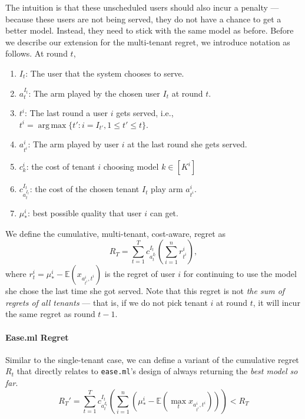 \documentclass[letterpaper]{vldb}
\newcommand{\eml}{\texttt{ease.ml}\xspace}
\DeclareMathOperator*{\argmax}{arg\,max}
\begin{document}
The intuition is that these unscheduled users should
also incur a penalty --- because these users are not being served,
they do not have a chance to
get a better model. Instead, they need to stick
with the same model as before. 
Before we describe our extension for the
multi-tenant regret, we introduce notation
as follows. At round $t$,
\begin{enumerate}[noitemsep,topsep=0pt,parsep=0pt,partopsep=0pt]
\item $I_t$: The user that the system chooses to
serve.
\item $a_{t}^{I_t}$: The arm played by the chosen user $I_t$ at round $t$.
\item $t^i$: The last round a user $i$ gets served, i.e., $t^i = \argmax\{t': i=I_{t'}, 1\le t'\le t\}$.
\item $a_{t^i}^i$: The arm played by user $i$ at the last round she gets served.
\item $c^i_k$: the cost of tenant $i$ choosing model $k\in [K^i]$
\item $c^{I_t}_{a_{t}^{I_t}}$: the cost of the chosen
tenant $I_t$ play arm $a_{t^i}^i$.
\item $\mu_*^i$: best possible quality that 
user $i$ can get.
\end{enumerate}

We define the cumulative,
multi-tenant, cost-aware, regret as
\[
R_T = \sum_{t=1}^T c^{I_t}_{a_{t}^{I_t}} \left (\sum_{i=1}^n r^i_{t^i} \right),
\]
where $r^i_t = \mu_*^i - \mathbb{E}(x_{a_{t^i}^i, t^i})$
is the regret of user $i$ for continuing to
use the model she chose the last time she
got served. 
Note that this regret is not {\em the sum of 
regrets of all tenants} --- that is, if we do not pick tenant $i$ at round $t$, it will incur the same regret 
as round $t-1$.

\paragraph*{Ease.ml Regret} Similar to
the single-tenant case, we can define
a variant of the cumulative 
regret $R_t$ that directly relates to
\eml's design of always returning the
{\em best model so far}. 
\[
R_T' = \sum_{t=1}^T
c^{I_t}_{a_{t}^{I_t}} 
\left(
\sum_{i=1}^n 
\left(
\mu_*^i - \mathbb{E}(\max_t x_{a_{t^i}^i, t^i})
\right)
\right) < R_T
\]
\end{document}
